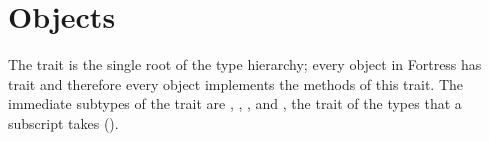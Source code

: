 %
%
%
%

\chapter{Objects}



The trait  is the single root of the type hierarchy; every
object in Fortress has trait  and therefore every object
implements the methods of this trait.  The immediate subtypes of the trait
 are , , \TYP{()}, and , the
trait of the types that a subscript takes ().

